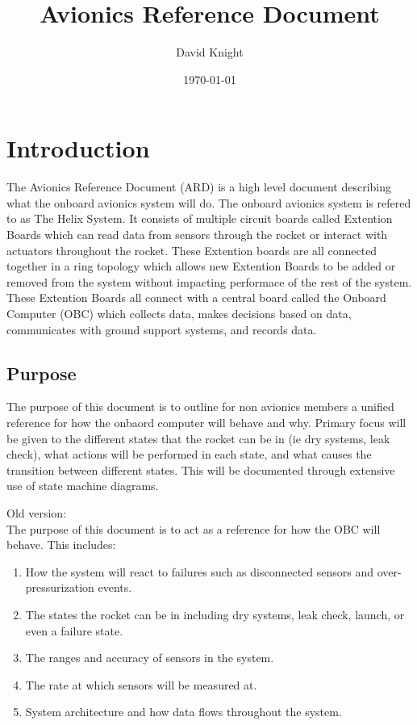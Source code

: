 \documentclass{article}
\title{Avionics Reference Document}
\author{David Knight}
\date{\today}
\begin{document}
\maketitle
{}
\newpage
\tableofcontents
{}
\newpage
\listoftables
\newpage
\listoffigures
\newpage

\section{Introduction}
The Avionics Reference Document (ARD) is a high level document describing what the onboard avionics system will do. The onboard avionics system is refered to as The Helix System. It consists of multiple circuit boards called Extention Boards which can read data from sensors through the rocket or interact with actuators throughout the rocket. These Extention boards are all connected together in a ring topology which allows new Extention Boards to be added or removed from the system without impacting performace of the rest of the system. These Extention Boards all connect with a central board called the Onboard Computer (OBC) which collects data, makes decisions based on data, communicates with ground support systems, and records data.

\subsection{Purpose}
The purpose of this document is to outline for non avionics members a unified reference for how the onbaord computer will behave and why. Primary focus will be given to the different states that the rocket can be in (ie dry systems, leak check), what actions will be performed in each state, and what causes the transition between different states. This will be documented through extensive use of state machine diagrams.

Old version:\\
The purpose of this document is to act as a reference for how the OBC will behave. This includes:
\begin{enumerate}
    \item How the system will react to failures such as disconnected sensors and over-pressurization events. 
    \item The states the rocket can be in including dry systems, leak check, launch, or even a failure state.
    \item The ranges and accuracy of sensors in the system.
    \item The rate at which sensors will be measured at.
    \item System architecture and how data flows throughout the system.
\end{enumerate}
\end{document}
